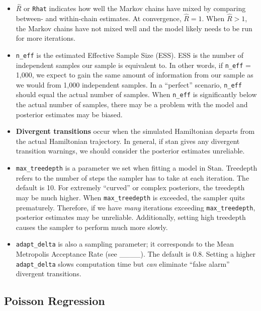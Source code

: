 \documentclass[
]{article}
\providecommand{\tightlist}{%
  \setlength{\itemsep}{0pt}\setlength{\parskip}{0pt}}
\begin{document}
\begin{itemize}
\tightlist
\item
  \(\hat{R}\) or \texttt{Rhat} indicates how well the Markov chains have
  mixed by comparing between- and within-chain estimates. At
  convergence, \(\hat{R} = 1\). When \(\hat{R} > 1\), the Markov chains
  have not mixed well and the model likely needs to be run for more
  iterations.\\
\item
  \texttt{n\_eff} is the estimated Effective Sample Size (ESS). ESS is
  the number of independent samples our sample is equivalent to. In
  other words, if \texttt{n\_eff} = 1,000, we expect to gain the same
  amount of information from our sample as we would from 1,000
  independent samples. In a ``perfect'' scenario, \texttt{n\_eff} should
  equal the actual number of samples. When \texttt{n\_eff} is
  significantly below the actual number of samples, there may be a
  problem with the model and posterior estimates may be biased.
\item
  \textbf{Divergent transitions} occur when the simulated Hamiltonian
  departs from the actual Hamiltonian trajectory. In general, if stan
  gives any divergent transition warnings, we should consider the
  posterior estimates unreliable.\\
\item
  \texttt{max\_treedepth} is a parameter we set when fitting a model in
  Stan. Treedepth refers to the number of steps the sampler has to take
  at each iteration. The default is 10. For extremely ``curved'' or
  complex posteriors, the treedepth may be much higher. When
  \texttt{max\_treedepth} is exceeded, the sampler quits prematurely.
  Therefore, if we have \emph{many} iterations exceeding
  \texttt{max\_treedepth}, posterior estimates may be unreliable.
  Additionally, setting high treedepth causes the sampler to perform
  much more slowly.
\item
  \texttt{adapt\_delta} is also a sampling parameter; it corresponds to
  the Mean Metropolis Acceptance Rate (see \_\_\_\_). The default is
  0.8. Setting a higher \texttt{adapt\_delta} slows computation time but
  \emph{can} eliminate ``false alarm'' divergent transitions.
\end{itemize}

\hypertarget{poisson-regression}{%
\subsection{Poisson Regression}\label{poisson-regression}}
\end{document}
